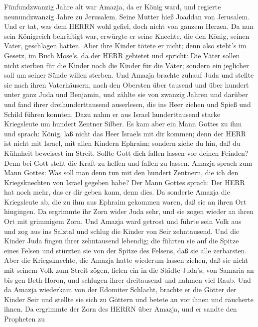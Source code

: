  Fünfundzwanzig Jahre alt war Amazja, da er König ward, und
regierte neunundzwanzig Jahre zu Jerusalem. Seine Mutter hieß Joaddan
von Jerusalem.  Und er tat, was dem HERRN wohl gefiel, doch
nicht von ganzem Herzen.  Da nun sein Königreich bekräftigt
war, erwürgte er seine Knechte, die den König, seinen Vater, geschlagen
hatten.  Aber ihre Kinder tötete er nicht; denn also steht's
im Gesetz, im Buch Mose's, da der HERR gebietet und spricht: Die Väter
sollen nicht sterben für die Kinder noch die Kinder für die Väter;
sondern ein jeglicher soll um seiner Sünde willen sterben. 
Und Amazja brachte zuhauf Juda und stellte sie nach ihren Vaterhäusern,
nach den Obersten über tausend und über hundert unter ganz Juda und
Benjamin, und zählte sie von zwanzig Jahren und darüber und fand ihrer
dreihunderttausend auserlesen, die ins Heer ziehen und Spieß und Schild
führen konnten.  Dazu nahm er aus Israel hunderttausend
starke Kriegsleute um hundert Zentner Silber.  Es kam aber
ein Mann Gottes zu ihm und sprach: König, laß nicht das Heer Israels mit
dir kommen; denn der HERR ist nicht mit Israel, mit allen Kindern
Ephraim;  sondern ziehe du hin, daß du Kühnheit beweisest im
Streit. Sollte Gott dich fallen lassen vor deinen Feinden? Denn bei Gott
steht die Kraft zu helfen und fallen zu lassen.  Amazja
sprach zum Mann Gottes: Was soll man denn tun mit den hundert Zentnern,
die ich den Kriegsknechten von Israel gegeben habe? Der Mann Gottes
sprach: Der HERR hat noch mehr, das er dir geben kann, denn dies.
 Da sonderte Amazja die Kriegsleute ab, die zu ihm aus
Ephraim gekommen waren, daß sie an ihren Ort hingingen. Da ergrimmte ihr
Zorn wider Juda sehr, und sie zogen wieder an ihren Ort mit grimmigem
Zorn.  Und Amazja ward getrost und führte sein Volk aus und
zog aus ins Salztal und schlug die Kinder von Seir zehntausend.
 Und die Kinder Juda fingen ihrer zehntausend lebendig; die
führten sie auf die Spitze eines Felsen und stürzten sie von der Spitze
des Felsens, daß sie alle zerbarsten.  Aber die
Kriegsknechte, die Amazja hatte wiederum lassen ziehen, daß sie nicht
mit seinem Volk zum Streit zögen, fielen ein in die Städte Juda's, von
Samaria an bis gen Beth-Horon, und schlugen ihrer dreitausend und nahmen
viel Raub.  Und da Amazja wiederkam von der Edomiter
Schlacht, brachte er die Götter der Kinder Seir und stellte sie sich zu
Göttern und betete an vor ihnen und räucherte ihnen.  Da
ergrimmte der Zorn des HERRN über Amazja, und er sandte den Propheten zu
